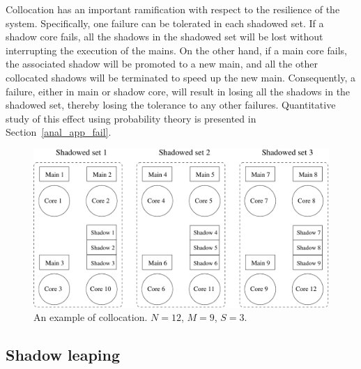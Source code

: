 Collocation has an important ramification with respect to the resilience of the system. Specifically, 
one failure can be tolerated in each shadowed set. If a shadow core fails, all the shadows in the 
shadowed set will be lost without interrupting the execution of the mains. 
On the other hand, if a main core fails, the associated shadow will be promoted to a new main, and all 
the other collocated shadows will be terminated to speed up the new main.
Consequently, a failure, either in main or shadow core, will result in losing all the shadows in the shadowed set, thereby losing the tolerance to any other failures. %
Quantitative study of this effect using probability theory is presented in Section~\ref{anal_app_fail}. %
 
\begin{figure}[!t]
  \begin{center}
    \includegraphics[width=\columnwidth]{Figures/sc_mapping.pdf}
  \end{center}
  \caption{An example of collocation. $N=12$, $M=9$, $S=3$.}
  \label{fig:sc_mapping}
\end{figure}




\subsection {Shadow leaping}
\label{sec:leaping_shadows}

